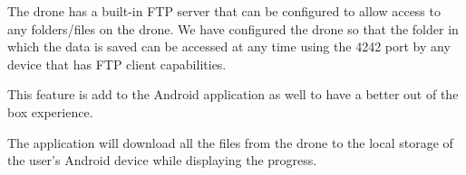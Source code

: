 The drone has a built-in FTP server that can be configured to allow access to any folders/files on the drone. We have configured the drone so that the folder in which the data is saved can be accessed at any time using the 4242 port by any device that has FTP client capabilities. 

This feature is add to the Android application as well to have a better out of the box experience.

The application will download all the files from the drone to the local storage of the user's Android device while displaying the progress.

